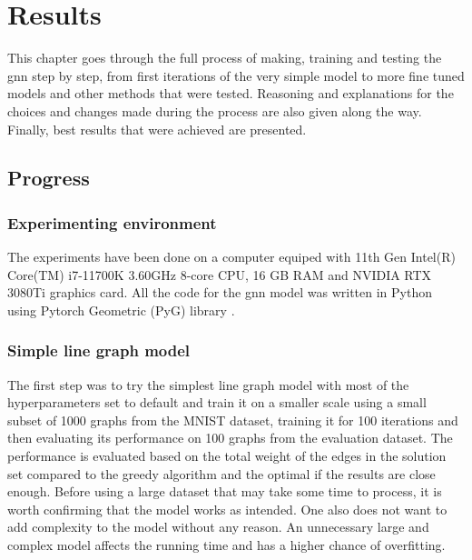 \chapter{Results}

This chapter goes through the full process of making, training and testing the \gls{gnn} step by step, from first iterations of the very simple model to more fine tuned models and other methods that were tested. Reasoning and explanations for the choices and changes made during the process are also given along the way. Finally, best results that were achieved are presented. 

\section{Progress}

\subsection{Experimenting environment}

The experiments have been done on a computer equiped with 11th Gen Intel(R) Core(TM) i7-11700K 3.60GHz 8-core CPU, 16 GB RAM and NVIDIA RTX 3080Ti graphics card. All the code for the \gls{gnn} model was written in Python using Pytorch Geometric (PyG) library \cite{pytorchlib}.

\subsection{Simple line graph model}

The first step was to try the simplest line graph model with most of the hyperparameters set to default and train it on a smaller scale using a small subset of 1000 graphs from the MNIST dataset, training it for 100 iterations and then evaluating its performance on 100 graphs from the evaluation dataset. The performance is evaluated based on the total weight of the edges in the solution set compared to the greedy algorithm and the optimal if the results are close enough. Before using a large dataset that may take some time to process, it is worth confirming that the model works as intended. One also does not want to add complexity to the model without any reason. An unnecessary large and complex model affects the running time and has a higher chance of overfitting. 

